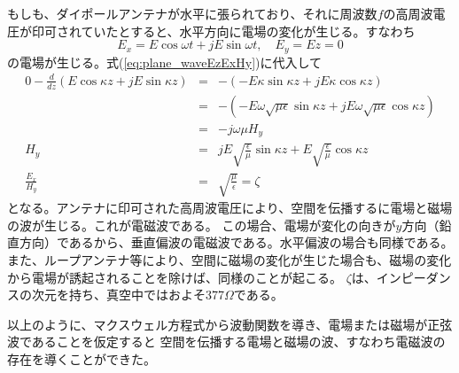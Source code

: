 もしも、ダイポールアンテナが水平に張られており、それに周波数$f$の高周波電圧が印可されていたとすると、水平方向に電場の変化が生じる。すなわち
\[
E_x = E\cos\omega t + jE\sin\omega t, \quad E_y=Ez=0
\]
の電場が生じる。式(\ref{eq:plane_waveEzExHy})に代入して
\begin{eqnarray}
0 - \frac{d}{dz}(E\cos\kappa z + jE\sin\kappa z) &=& -(-E\kappa\sin\kappa z + jE\kappa\cos\kappa z) \nonumber\\
&=&-(-E\omega\sqrt{\mu\epsilon}\sin\kappa z + jE\omega\sqrt{\mu\epsilon}\cos\kappa z) \nonumber\\
&=&-j\omega\mu H_y \nonumber\\
H_y&=&jE\sqrt{\frac{\epsilon}{\mu}}\sin\kappa z + E\sqrt{\frac{\epsilon}{\mu}}\cos\kappa z \nonumber\\
\frac{E_x}{H_y} &=& \sqrt{\frac{\mu}{\epsilon}} = \zeta
\end{eqnarray}
となる。アンテナに印可された高周波電圧により、空間を伝播するに電場と磁場の波が生じる。これが電磁波である。
この場合、電場が変化の向きが$y$方向（鉛直方向）であるから、垂直偏波の電磁波である。水平偏波の場合も同様である。
また、ループアンテナ等により、空間に磁場の変化が生じた場合も、磁場の変化から電場が誘起されることを除けば、同様のことが起こる。
$\zeta$は、インピーダンスの次元を持ち、真空中ではおよそ377$\Omega$である。

以上のように、マクスウェル方程式から波動関数を導き、電場または磁場が正弦波であることを仮定すると
空間を伝播する電場と磁場の波、すなわち電磁波の存在を導くことができた。
